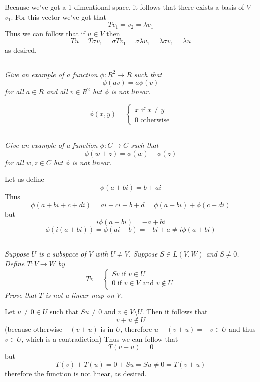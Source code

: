 \documentclass[11pt,oneside,titlepage]{book}
\begin{document}
Because we've got a 1-dimentional space, it follows that there exists a basis of $V$ - $v_1$.
For this vector we've got that
$$T v_1 = v_2 = \lambda v_1$$
Thus we can follow that if $u \in V$ then
$$T u = T \sigma v_1 =  \sigma T v_1 = \sigma \lambda v_1 = \lambda \sigma v_1 = \lambda u$$
as desired.

\subsection{}
\textit{Give an example of a function $\phi: R^2 \to R$ such that }
$$\phi (av) = a\phi(v)$$
\textit{for all $a \in R$ and all $v \in R^2$ but $\phi$ is not linear.}

$$\phi(x, y) =
\begin{cases}
  x \text{ if } x \neq y \\
  0 \text{ otherwise}
\end{cases}
$$

\subsection{}
\textit{Give an example of a function $\phi: C \to C$ such that }
$$\phi (w + z) = \phi(w) + \phi(z)$$
\textit{for all $w, z \in C$ but $\phi$ is not linear.}

Let us define 
$$\phi(a + bi) = b + ai$$
Thus 
$$\phi(a + bi + c + di) = ai + ci + b + d = \phi(a + bi) + \phi(c + di)$$
but
$$i \phi(a + bi) = -a + bi$$
$$\phi(i(a + bi)) = \phi(ai - b) = -bi + a \neq i \phi(a + bi)$$

\subsection{}
\textit{Suppose $U$ is a subspace of $V$ with $U \neq V$. Suppose $S \in L(V, W)$ and
  $S \neq 0$. Define $T: V \to W$ by}
$$Tv =
\begin{cases}
  Sv \text{ if } v \in U \\
  0 \text{ if } v \in V \text{ and } v \notin U
\end{cases}
$$
\textit{Prove that $T$ is not a linear map on $V$.}

Let $u \neq 0 \in U$ such that $Su \neq 0$ and $v \in V \setminus U$. Then it follows that
$$v + u \notin U$$
(because otherwise $-(v + u)$ is in $U$, therefore $u - (v + u) = -v \in U$ and
thus $v \in U$, which is a contradiction)
Thus we can follow that
$$T(v + u) = 0$$
but
$$T(v) + T(u) = 0 + Su = Su \neq 0 = T(v + u)$$
therefore the function is not linear, as desired.
\end{document}
